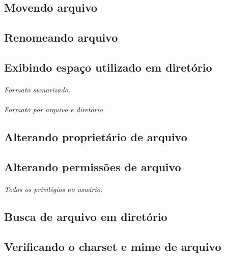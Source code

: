 \documentclass[a4paper,9pt]{extarticle}
\begin{document}
\begin{multicols}{2}
\subsection{Movendo arquivo} 
	


\subsection{Renomeando arquivo}

 	

\subsection{Exibindo espaço utilizado em diretório}
	
	\paragraph{} \emph{Formato sumarizado.}
	\paragraph{} \emph{Formato por arquivo e diretório.}
	
\subsection{Alterando proprietário de arquivo}

	
\subsection{Alterando permissões de arquivo}

	\paragraph{} \emph{Todos os privilégios ao usuário.}
	
\subsection{Busca de arquivo em diretório}
\subsection{Verificando o charset e mime de arquivo}
	

\end{multicols}
\end{document}
